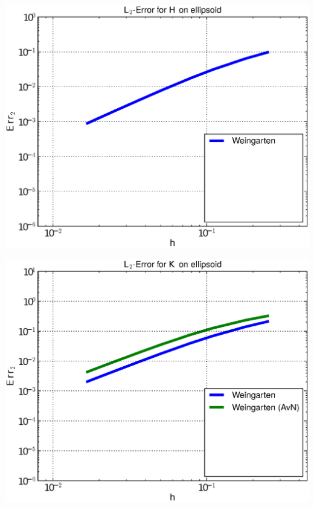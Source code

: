 \documentclass[handout]{beamer}
\begin{document}
\begin{frame}
\begin{overprint}
\begin{minipage}[t]{0.49\textwidth}
          \end{minipage}\hfill
          \begin{minipage}[t]{0.49\textwidth}
            \centering\includegraphics[width=\textwidth]{bilder/Curvature/heineC/ErrHL2_1.eps}
          \end{minipage}
          \begin{minipage}[t]{0.49\textwidth}
            \centering\includegraphics[width=\textwidth]{bilder/Curvature/heineC/ErrKL2_2.eps}
          \end{minipage}\hfill
          \begin{minipage}[t]{0.49\textwidth}

\end{minipage}
\end{overprint}
\end{frame}
\end{document}
